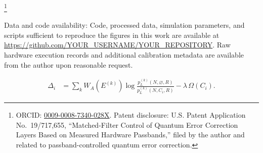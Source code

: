 
\author{Ethan A. Caspian}
\thanks{ORCID: \href{https://orcid.org/0009-0008-7340-028X}{0009-0008-7340-028X}.
Patent disclosure: U.S. Patent Application No.~19/717,655,
``Matched-Filter Control of Quantum Error Correction Layers Based on
Measured Hardware Passbands,'' filed by the author and related to
passband-controlled quantum error correction.}


Data and code availability: Code, processed data, simulation parameters,
and scripts sufficient to reproduce the figures in this work are available at
\url{https://github.com/YOUR_USERNAME/YOUR_REPOSITORY}. Raw hardware
execution records and additional calibration metadata are available from the
author upon reasonable request.


\begin{equation}
\begin{split}
\Delta_i
&= \sum_k W_A(E^{(k)})
   \log\!\frac{p_L^{(k)}(N,\varnothing,R)}
             {p_L^{(k)}(N,C_i,R)}
   - \lambda\,\Omega(C_i).
\end{split}
\label{eq:delta}
\end{equation}
